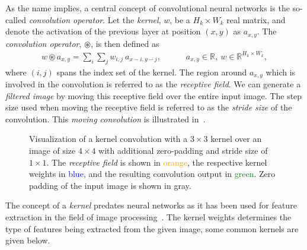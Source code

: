 As the name implies, a central concept of convolutional neural networks is the so-called \textit{convolution operator}.
Let the \textit{kernel}, $w$, be a $H_k \times W_k$ real matrix, and denote the activation of the previous layer at position $(x, y)$ as $a_{x, y}$.
The \textit{convolution operator}, $\circledast$, is then defined as
%
\begin{align*}
  w \circledast a_{x, y} = \sum_{i} \sum_{j} w_{i, j} ~ a_{x - i, y - j},
  \hspace{3em}
    a_{x, y} \in \mathbb{R},~
    w \in \mathbb{R}^{H_k \times W_k},
\end{align*}
%
where $(i, j)$ spans the index set of the kernel.
The region around $a_{x,y}$ which is involved in the convolution is referred to as the \textit{receptive field}.
We can generate a \textit{filtered image} by moving this receptive field over the entire input image.
The step size used when moving the receptive field is referred to as the \textit{stride size} of the convolution.
This \textit{moving convolution} is illustrated in~.

\begin{figure}[htb]
  
  \caption{
    Visualization of a kernel convolution with a $3 \times 3$ kernel over an image of size $4 \times 4$ with additional zero-padding and stride size of $1 \times 1$.
    The \textit{receptive field} is shown in \textcolor{orange}{orange}, the respective kernel weights in \textcolor{blue}{blue}, and the resulting convolution output in \textcolor{green}{green}.
    Zero padding of the input image is shown in gray.
  }%
  \label{fig:convolution}
\end{figure}

The concept of a \textit{kernel} predates neural networks as it has been used for feature extraction in the field of image processing~\cite[p.~11]{computer_vision_history}.
The kernel weights determines the type of features being extracted from the given image, some common kernels are given below.

